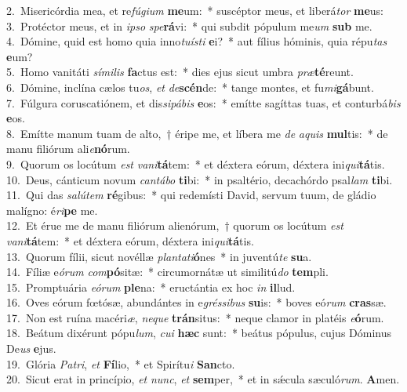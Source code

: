 {2.~}Misericórdia mea, et re\textit{fú}\textit{gi}\textit{um} \textbf{me}um:~* suscéptor meus, et liberá\textit{tor} \textbf{me}us:\\
{3.~}Protéctor meus, et in \textit{i}\textit{pso} \textit{spe}\textbf{rá}vi:~* qui subdit pópulum me\textit{um} \textbf{sub} me.\\
{4.~}Dómine, quid est homo quia inno\textit{tu}\textit{í}\textit{sti} \textbf{e}i?~* aut fílius hóminis, quia répu\textit{tas} \textbf{e}um?\\
{5.~}Homo vanitáti \textit{sí}\textit{mi}\textit{lis} \textbf{fa}ctus est:~* dies ejus sicut umbra \textit{præ}\textbf{té}reunt.\\
{6.~}Dómine, inclína cælos tu\textit{os}, \textit{et} \textit{de}\textbf{scén}de:~* tange montes, et fu\textit{mi}\textbf{gá}bunt.\\
{7.~}Fúlgura coruscatiónem, et dis\textit{si}\textit{pá}\textit{bis} \textbf{e}os:~* emítte sagíttas tuas, et conturbá\textit{bis} \textbf{e}os.\\
{8.~}Emítte manum tuam de alto,~† éripe me, et líbera me \textit{de} \textit{a}\textit{quis} \textbf{mul}tis:~* de manu filiórum ali\textit{e}\textbf{nó}rum.\\
{9.~}Quorum os locútum \textit{est} \textit{va}\textit{ni}\textbf{tá}tem:~* et déxtera eórum, déxtera ini\textit{qui}\textbf{tá}tis.\\
{10.~}Deus, cánticum novum \textit{can}\textit{tá}\textit{bo} \textbf{ti}bi:~* in psaltério, decachórdo psal\textit{lam} \textbf{ti}bi.\\
{11.~}Qui das \textit{sa}\textit{lú}\textit{tem} \textbf{ré}gibus:~* qui redemísti David, servum tuum, de gládio malígno: é\textit{ri}\textbf{pe} me.\\
{12.~}Et érue me de manu filiórum alienórum,~† quorum os locútum \textit{est} \textit{va}\textit{ni}\textbf{tá}tem:~* et déxtera eórum, déxtera ini\textit{qui}\textbf{tá}tis.\\
{13.~}Quorum fílii, sicut novéllæ \textit{plan}\textit{ta}\textit{ti}\textbf{ó}nes~* in juventú\textit{te} \textbf{su}a.\\
{14.~}Fíliæ e\textit{ó}\textit{rum} \textit{com}\textbf{pó}sitæ:~* circumornátæ ut similitú\textit{do} \textbf{tem}pli.\\
{15.~}Promptuária \textit{e}\textit{ó}\textit{rum} \textbf{ple}na:~* eructántia ex hoc \textit{in} \textbf{il}lud.\\
{16.~}Oves eórum fœtósæ, abundántes in e\textit{grés}\textit{si}\textit{bus} \textbf{su}is:~* boves eó\textit{rum} \textbf{cras}sæ.\\
{17.~}Non est ruína macéri\textit{æ}, \textit{ne}\textit{que} \textbf{trán}situs:~* neque clamor in platéis \textit{e}\textbf{ó}rum.\\
{18.~}Beátum dixérunt pópu\textit{lum}, \textit{cu}\textit{i} \textbf{hæc} sunt:~* beátus pópulus, cujus Dóminus De\textit{us} \textbf{e}jus.\\
{19.~}Glória \textit{Pa}\textit{tri}, \textit{et} \textbf{Fí}lio,~* et Spirítu\textit{i} \textbf{San}cto.\\
{20.~}Sicut erat in princípio, \textit{et} \textit{nunc}, \textit{et} \textbf{sem}per,~* et in sǽcula sæculó\textit{rum}. \textbf{A}men.\\
